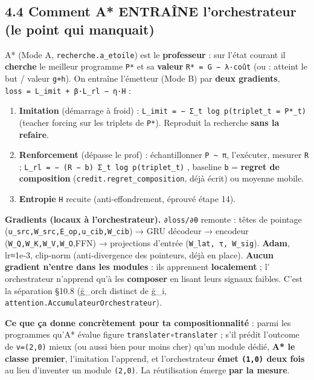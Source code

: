 \documentclass[
  french,
  11pt,
]{article}
\providecommand{\tightlist}{%
  \setlength{\itemsep}{0pt}\setlength{\parskip}{0pt}}
\begin{document}
\subsection{4.4 Comment A* ENTRAÎNE l'orchestrateur (le point qui
manquait)}\label{comment-a-entrauxeene-lorchestrateur-le-point-qui-manquait}

A* (Mode A, \texttt{recherche.a\_etoile}) est le \textbf{professeur} :
sur l'état courant il \textbf{cherche} le meilleur programme \texttt{P*}
et sa \textbf{valeur} \texttt{R*\ =\ G\ −\ λ·coût} (ou : atteint le but
/ valeur \texttt{g+h}). On entraîne l'émetteur (Mode B) par \textbf{deux
gradients}, \texttt{loss\ =\ L\_imit\ +\ β·L\_rl\ −\ η·H} :

\begin{enumerate}
\def\labelenumi{\arabic{enumi}.}
\tightlist
\item
  \textbf{Imitation} (démarrage à froid) :
  \texttt{L\_imit\ =\ −\ Σ\_t\ log\ p(triplet\_t\ =\ P*\_t)} (teacher
  forcing sur les triplets de \texttt{P*}). Reproduit la recherche
  \textbf{sans la refaire}.
\item
  \textbf{Renforcement} (dépasse le prof) : échantillonner
  \texttt{P\ \textasciitilde{}\ π}, l'exécuter, mesurer \texttt{R} ;
  \texttt{L\_rl\ =\ −\ (R\ −\ b)\ Σ\_t\ log\ p(triplet\_t)} , baseline
  \texttt{b} = \textbf{regret de composition}
  (\texttt{credit.regret\_composition}, déjà écrit) ou moyenne mobile.
\item
  \textbf{Entropie} \texttt{H} recuite (anti‑effondrement, éprouvé étape
  14).
\end{enumerate}

\textbf{Gradients (locaux à l'orchestrateur).} \texttt{∂loss/∂θ} remonte
: têtes de pointage (\texttt{u\_src,W\_src,E\_op,u\_cib,W\_cib}) → GRU
décodeur → encodeur (\texttt{W\_Q,W\_K,W\_V,W\_O},FFN) → projections
d'entrée (\texttt{W\_lat,\ τ,\ W\_sig}). \textbf{Adam}, lr≈1e‑3,
clip‑norm (anti‑divergence des pointeurs, déjà en place). \textbf{Aucun
gradient n'entre dans les modules} : ils apprennent \textbf{localement}
; l' orchestrateur n'apprend qu'à les \textbf{composer} en lisant leurs
signaux faibles. C'est la séparation §10.8 (ḡ\_orch distinct de ḡ\_i,
\texttt{attention.AccumulateurOrchestrateur}).

\textbf{Ce que ça donne concrètement pour ta compositionnalité} : parmi
les programmes qu'A* évalue figure \texttt{translater∘translater} ; s'il
prédit l'outcome de \texttt{v=(2,0)} mieux (ou aussi bien pour moins
cher) qu'un module dédié, \textbf{A* le classe premier}, l'imitation
l'apprend, et l'orchestrateur \textbf{émet \texttt{(1,0)} deux fois} au
lieu d'inventer un module \texttt{(2,0)}. La réutilisation émerge
\textbf{par la mesure}.
\end{document}
